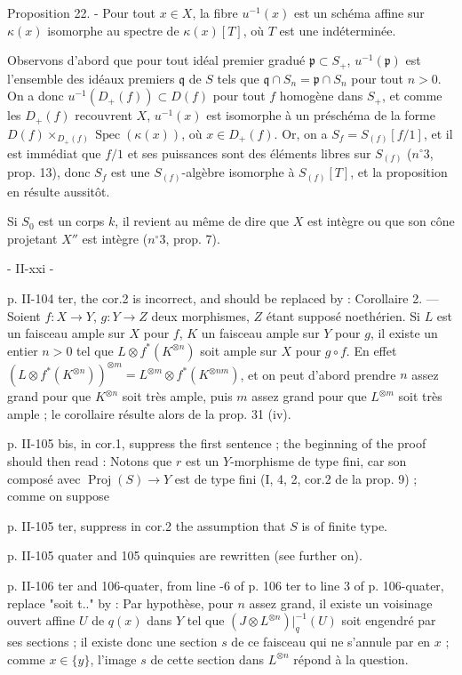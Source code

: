 Proposition 22. - Pour tout $x \in X$, la fibre $u^{-1}(x)$ est un schéma affine sur $\kappa(x)$ isomorphe au spectre de $\kappa(x)[T]$, où $T$ est une indéterminée.

Observons d'abord que pour tout idéal premier gradué $\mathfrak{p} \subset S_+$, $u^{-1}(\mathfrak{p})$ est l'ensemble des idéaux premiers $\mathfrak{q}$ de $S$ tels que $\mathfrak{q} \cap S_n = \mathfrak{p} \cap S_n$ pour tout $n > 0$. On a donc $u^{-1}(D_+(f)) \subset D(f)$ pour tout $f$ homogène dans $S_+$, et comme les $D_+(f)$ recouvrent $X$, $u^{-1}(x)$ est isomorphe à un préschéma de la forme $D(f) \times_{D_+(f)} \operatorname{Spec}(\kappa(x))$, où $x \in D_+(f)$. Or, on a $S_f = S_{(f)}[f/1]$, et il est immédiat que $f/1$ et ses puissances sont des éléments libres sur $S_{(f)}$ ($n^\circ 3$, prop. 13), donc $S_f$ est une $S_{(f)}$-algèbre isomorphe à $S_{(f)}[T]$, et la proposition en résulte aussitôt.

Si $S_0$ est un corps $k$, il revient au même de dire que $X$ est intègre ou que son cône projetant $X''$ est intègre ($n^\circ 3$, prop. 7).

\newpage


- II-xxi -

p. II-104 ter, the cor.2 is incorrect, and should be replaced by :
Corollaire 2. — Soient $f: X \to Y$, $g: Y \to Z$ deux morphismes, $Z$ étant supposé noethérien. Si $L$ est un faisceau ample sur $X$ pour $f$, $K$ un faisceau ample sur $Y$ pour $g$, il existe un entier $n > 0$ tel que $L \otimes f^*(K^{\otimes n})$ soit ample sur $X$ pour $g \circ f$.
En effet $(L \otimes f^*(K^{\otimes n}))^{\otimes m} = L^{\otimes m} \otimes f^*(K^{\otimes nm})$, et on peut d'abord prendre $n$ assez grand pour que $K^{\otimes n}$ soit très ample, puis $m$ assez grand pour que $L^{\otimes m}$ soit très ample ; le corollaire résulte alors de la prop. 31 (iv).

p. II-105 bis, in cor.1, suppress the first sentence ; the beginning of the proof should then read :
Notons que $r$ est un $Y$-morphisme de type fini, car son composé avec $\operatorname{Proj}(S) \to Y$ est de type fini (I, 4, 2, cor.2 de la prop. 9) ; comme on suppose

p. II-105 ter, suppress in cor.2 the assumption that $S$ is of finite type.

p. II-105 quater and 105 quinquies are rewritten (see further on).

p. II-106 ter and 106-quater, from line -6 of p. 106 ter to line 3 of p. 106-quater, replace "soit t.." by :
Par hypothèse, pour $n$ assez grand, il existe un voisinage ouvert affine $U$ de $q(x)$ dans $Y$ tel que $(J \otimes L^{\otimes n})|_q^{-1}(U)$ soit engendré par ses sections ; il existe donc une section $s$ de ce faisceau qui ne s'annule par en $x$ ; comme $x \in \{y\}$, l'image $s$ de cette section dans $L^{\otimes n}$ répond à la question.

